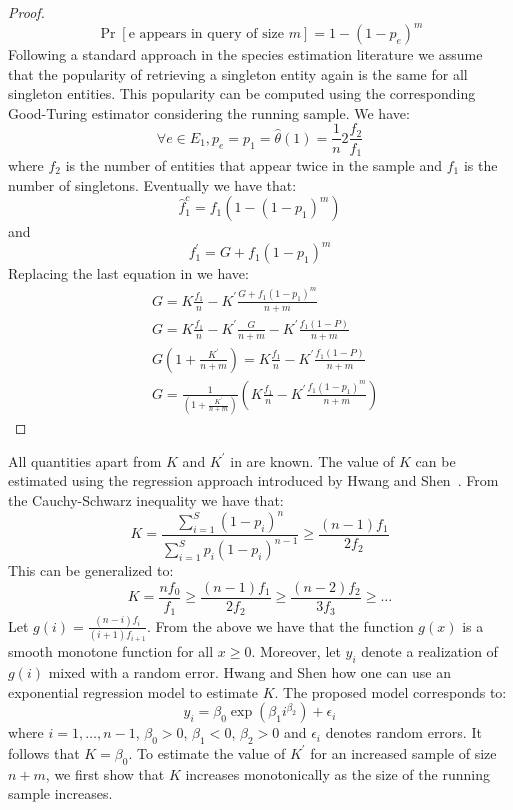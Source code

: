 \begin{proof}
\begin{equation}
\Pr[\mbox{e appears in query of size $m$}] = 1 - (1-p_e)^m
\end{equation}
Following a standard approach in the species estimation literature we assume that the popularity of retrieving a singleton entity again is the same for all singleton entities. This popularity can be computed using the corresponding Good-Turing estimator considering the running sample. We have:
\begin{equation}
\forall e \in E_1, p_e = p_1 = \hat{\theta}(1) = \frac{1}{n}2\frac{f_2}{f_1}
\end{equation}
where $f_2$ is the number of entities that appear twice in the sample and $f_1$ is the number of singletons. 
Eventually we have that:
\begin{equation}
\hat{f}_1^c = f_1(1 - (1-p_1)^m)
\end{equation}
and
\begin{equation}
f^{\prime}_1 = G + f_1(1-p_1)^m
\end{equation}
Replacing the last equation in  we have:
\begin{align}
&G = K\frac{f_1}{n} - K^{\prime}\frac{G + f_1(1-p_1)^m}{n+m} \nonumber \\
&G = K\frac{f_1}{n} - K^{\prime}\frac{G}{n+m} - K^{\prime}\frac{f_1(1- P)}{n+m} \nonumber \\
&G(1 + \frac{K^{\prime}}{n+m}) = K\frac{f_1}{n} - K^{\prime}\frac{f_1(1- P)}{n+m} \nonumber \\
&G = \frac{1}{(1 + \frac{K^{\prime}}{n+m})}(K\frac{f_1}{n} - K^{\prime}\frac{f_1(1-p_1)^m}{n+m}) \nonumber
\end{align}
\end{proof}
\fi
All quantities apart from $K$ and $K^{\prime}$ in  are known. The value of $K$ can be estimated using the regression approach introduced by Hwang and Shen~\cite{hwang:2010}. \iftr From the Cauchy-Schwarz inequality we have that:
\begin{equation}
K = \frac{\sum_{i=1}^S (1-p_i)^n}{\sum_{i=1}^S p_i(1-p_i)^{n-1}} \geq \frac{(n-1)f_1}{2f_2}
\end{equation}
This can be generalized to:
\begin{equation}
K=\frac{nf_0}{f_1} \geq \frac{(n-1)f_1}{2f_2} \geq \frac{(n-2)f_2}{3f_3} \geq \dots
\end{equation}
Let $g(i) = \frac{(n-i)f_i}{(i+1)f_{i+1}}$. From the above we have that the function $g(x)$ is a smooth monotone function for all $x \geq 0$. Moreover, let $y_i$ denote a realization of $g(i)$ mixed with a random error. Hwang and Shen how one can use an exponential regression model to estimate $K$. The proposed model corresponds to:
\begin{equation}
y_i = \beta_0\exp(\beta_1i^{\beta_2}) + \epsilon_i
\end{equation}
where $i = 1, \dots, n-1$, $\beta_0 > 0$, $\beta_1 < 0$, $\beta_2 >0$ and $\epsilon_i$ denotes random errors. It follows that $K = \beta_0$. \fi
To estimate the value of $K^{\prime}$ for an increased sample of size $n+m$, we first show that $K$ increases monotonically as the size of the running sample increases. 

